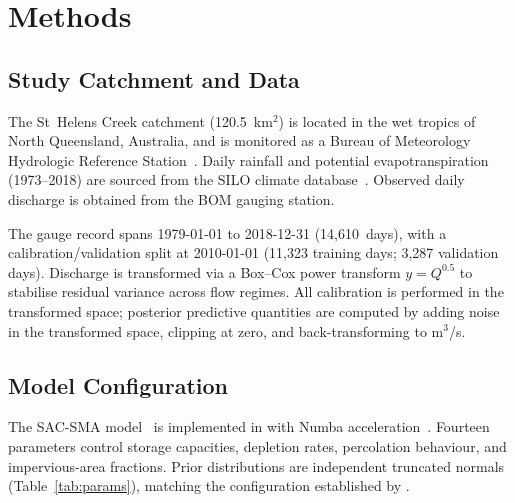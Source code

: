 \documentclass[article,nojss]{jss}
\begin{document}
\section{Methods}

\subsection{Study Catchment and Data}

The St~Helens Creek catchment (120.5~km$^2$) is located in the wet
tropics of North Queensland, Australia, and is monitored as a Bureau of
Meteorology Hydrologic Reference Station~\cite{Zhang2014}.
Daily rainfall and potential evapotranspiration (1973--2018) are sourced
from the SILO climate database~\cite{Jeffrey2001}.
Observed daily discharge is obtained from the BOM gauging station.

The gauge record spans 1979-01-01 to 2018-12-31 (14,610~days), with a
calibration/validation split at 2010-01-01 (11,323 training days; 3,287
validation days).
Discharge is transformed via a Box--Cox power transform
$y = Q^{0.5}$ to stabilise residual variance across flow regimes.
All calibration is performed in the transformed space; posterior
predictive quantities are computed by adding noise in the transformed
space, clipping at zero, and back-transforming to m$^{3}$/s.

\subsection{Model Configuration}

The SAC-SMA model~\cite{Burnash1995} is implemented in
 with Numba acceleration~\cite{Lam2015}.
Fourteen parameters control storage capacities, depletion rates,
percolation behaviour, and impervious-area fractions.
Prior distributions are independent truncated normals
(Table~\ref{tab:params}), matching the configuration established by
\cite{Bennett2026}.
\end{document}

